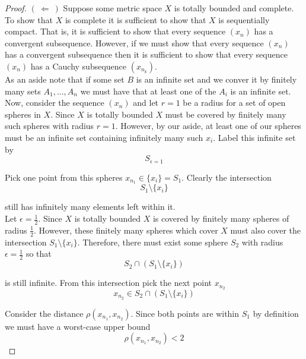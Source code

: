 \documentclass[12pt]{article}
\newlength\tindent
\renewcommand{\indent}{\hspace*{\tindent}}
\newcommand{\limplies}{~\Longleftarrow ~} %
\newcommand{\rimplies}{\implies} %
\begin{document}
\begin{proof}
$(\limplies)$ Suppose some metric space $X$ is totally bounded and complete. To show that $X$ is complete it is sufficient to show that $X$ is sequentially compact. That is, it is sufficient to show that every sequence $(x_n)$ has a convergent subsequence. However, if we must show that every sequence $(x_n)$ has a convergent subsequence then it is sufficient to show that every sequence $(x_n)$ has a Cauchy subsequence $(x_{n_k})$. \\

\indent As an aside note that if some set $B$ is an infinite set and we conver it by finitely many sets $A_1, ..., A_n$ we must have that at least one of the $A_i$ is an infinite set. \\

\indent Now, consider the sequence $(x_n)$ and let $r = 1$ be a radius for a set of open spheres in $X$. Since $X$ is totally bounded $X$ must be covered by finitely many such spheres with radius $r = 1$. However, by our aside, at least one of our spheres must be an infinite set containing infinitely many such $x_i$. Label this infinite set by
\begin{equation*}
	S_{\epsilon = 1}
\end{equation*}

Pick one point from this spheres $x_{n_1} \in \{x_i\} = S_1$. Clearly the intersection
\begin{equation*}
	S_1 \setminus \{x_i\}
\end{equation*}

still has infinitely many elements left within it. \\

\indent Let $\epsilon = \frac{1}{2}$. Since $X$ is totally bounded $X$ is covered by finitely many spheres of radius $\frac{1}{2}$. However, these finitely many spheres which cover $X$ must also cover the intersection $S_1 \setminus \{x_i\}$. Therefore, there must exist some sphere $S_2$ with radius $\epsilon = \frac{1}{2}$ so that
\begin{equation*}
	S_2 \cap \left( S_1 \setminus \{x_i\} \right)
\end{equation*}

is still infinite. From this intersection pick the next point $x_{n_2}$
\begin{equation*}
	x_{n_2} \in S_2 \cap \left( S_1 \setminus \{x_i\} \right)
\end{equation*}

\indent Consider the distance $\rho(x_{n_1}, x_{n_2})$. Since both points are within $S_1$ by definition we must have a worst-case upper bound
\begin{equation*}
	\rho(x_{n_1}, x_{n_2}) < 2
\end{equation*}


\end{proof}
\end{document}
